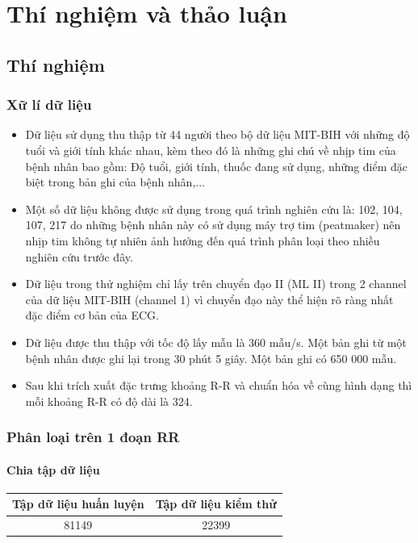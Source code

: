\chapter{Thí nghiệm và thảo luận}
\thispagestyle{fancy}

\section{Thí nghiệm}

\subsection{Xữ lí dữ liệu}
\begin{itemize}
    \item Dữ liệu sử dụng thu thập từ 44 người theo bộ dữ liệu MIT-BIH với những độ tuổi và giới tính khác nhau, kèm theo đó là những ghi chú về nhịp tim của bệnh nhân bao gồm: Độ tuổi, giới tính, thuốc đang sử dụng, những điểm đặc biệt trong bản ghi của bệnh nhân,...
    \item Một số dữ liệu không được sử dụng trong quá trình nghiên cứu là: 102, 104, 107, 217 do những bệnh nhân này có sử dụng máy trợ tim (peatmaker) nên nhịp tim không tự nhiên ảnh hưởng đến quá trình phân loại theo nhiều nghiên cứu trước đây.
    \item Dữ liệu trong thử nghiệm chỉ lấy trên chuyển đạo II (ML II) trong 2 channel của dữ liệu MIT-BIH (channel 1) vì chuyển đạo này thể hiện rõ ràng nhất đặc điểm cơ bản của ECG.\cite{something}
    \item Dữ liệu được thu thập với tốc độ lấy mẫu là 360 mẫu/s. Một bản ghi từ một bệnh nhân được ghi lại trong 30 phút 5 giây. Một bản ghi có 650 000 mẫu.
    \item Sau khi trích xuất đặc trưng khoảng R-R và chuẩn hóa về cùng hình dạng thì mỗi khoảng R-R có độ dài là 324.
\end{itemize}

\subsection{Phân loại trên 1 đoạn RR}
\subsubsection{Chia tập dữ liệu}
\begin{center}
    \begin{tabular}{|c|c|}
    \hline 
    Tập dữ liệu huấn luyện & Tập dữ liệu kiểm thử \\ 
    \hline 
    81149 & 22399\\
    \hline 
    \end{tabular}
\end{center}

